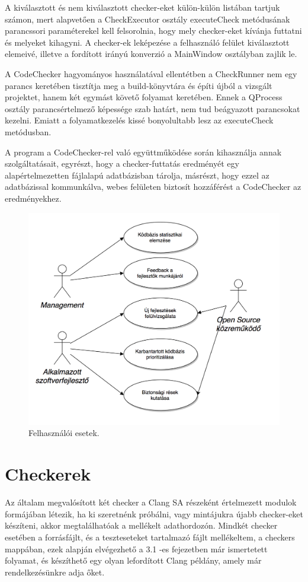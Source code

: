 \documentclass[a4paper,12pt]{report}
\begin{document}
A kiválasztott és nem kiválasztott checker-eket külön-külön listában tartjuk számon, mert alapvetően a CheckExecutor osztály executeCheck metódusának parancssori paraméterekel kell felsorolnia, hogy mely checker-eket kívánja futtatni és melyeket kihagyni. A checker-ek leképezése a felhasználó felület kiválasztott elemeivé, illetve a fordított irányú konverzió a MainWindow osztályban zajlik le.

A CodeChecker hagyományos használatával ellentétben a CheckRunner nem egy parancs keretében tisztítja meg a build-könyvtára és építi újból a vizsgált projektet, hanem két egymást követő folyamat keretében. Ennek a QProcess osztály parancsértelmező képessége szab határt, nem tud beágyazott parancsokat kezelni. Emiatt a folyamatkezelés kissé bonyolultabb lesz az executeCheck metódusban.

A program a CodeChecker-rel való együttműködése során kihasználja  annak szolgáltatásait, egyrészt, hogy a checker-futtatás eredményét egy alapértelmezetten fájlalapú adatbázisban tárolja, másrészt, hogy ezzel az adatbázissal kommunkálva, webes felületen biztosít hozzáférést a CodeChecker az eredményekhez.

\begin{figure}[h]
\caption{Felhasználói esetek.}
\centering
\includegraphics[scale=0.7]{felhasznaloi.png}
\end{figure}

\section{Checkerek}
Az általam megvalósított két checker a Clang SA részeként értelmezett modulok formájában létezik, ha ki szeretnénk próbálni, vagy mintájukra újabb checker-eket készíteni, akkor megtalálhatóak a mellékelt adathordozón. Mindkét checker esetében a forrásfájlt, és a teszteseteket tartalmazó fájlt mellékeltem, a checkers mappában, ezek alapján elvégezhető a 3.1 -es fejezetben már ismertetett folyamat, és készíthető egy olyan lefordított Clang példány, amely már rendelkezésünkre adja őket.
\end{document}
